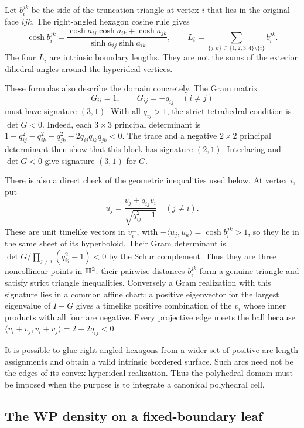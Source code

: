 Let $b_i^{jk}$ be the side of the truncation triangle at vertex $i$ that lies
in the original face $ijk$. The right-angled hexagon cosine rule gives
\begin{equation}
 \cosh b_i^{jk}=
 \frac{\cosh a_{ij}\cosh a_{ik}+\cosh a_{jk}}
      {\sinh a_{ij}\sinh a_{ik}},
 \qquad
 L_i=\sum_{\{j,k\}\subset\{1,2,3,4\}\setminus\{i\}}b_i^{jk}.
 \label{eq:truncationlengths}
\end{equation}
The four $L_i$ are intrinsic boundary lengths. They are not the sums of the
exterior dihedral angles around the hyperideal vertices.

These formulas also describe the domain concretely. The Gram matrix
\begin{equation}
 G_{ii}=1,\qquad G_{ij}=-q_{ij}\quad(i\ne j)
 \label{eq:gram}
\end{equation}
must have signature $(3,1)$. With all $q_{ij}>1$, the strict tetrahedral
condition is $\det G<0$. Indeed, each $3\times3$ principal determinant is
$1-q_{ij}^2-q_{ik}^2-q_{jk}^2-2q_{ij}q_{ik}q_{jk}<0$.
The trace and a negative $2\times2$ principal determinant then show that
this block has signature $(2,1)$. Interlacing and $\det G<0$ give
signature $(3,1)$ for $G$.

There is also a direct check of the geometric inequalities used below.
At vertex $i$, put
\[
 u_j=\frac{v_j+q_{ij}v_i}{\sqrt{q_{ij}^2-1}}\quad(j\ne i).
\]
These are unit timelike vectors in $v_i^\perp$, with
$-\langle u_j,u_k\rangle=\cosh b_i^{jk}>1$, so they lie in the same
sheet of its hyperboloid. Their Gram determinant is
$\det G/\prod_{j\ne i}(q_{ij}^2-1)<0$ by the Schur complement.
Thus they are three noncollinear points in $\mathbb H^2$: their pairwise
distances $b_i^{jk}$ form a genuine triangle and satisfy strict triangle
inequalities. Conversely a Gram realization with this signature lies in
a common affine chart: a positive eigenvector for the largest eigenvalue
of $I-G$ gives a timelike positive combination of the $v_i$ whose inner
products with all four are negative. Every projective edge meets the ball
because $\langle v_i+v_j,v_i+v_j\rangle=2-2q_{ij}<0$.

It is possible to glue right-angled hexagons from a wider set of positive
arc-length assignments and obtain a valid intrinsic bordered surface. Such
arcs need not be the edges of its convex hyperideal realization. Thus the
polyhedral domain must be imposed when the purpose is to integrate a
canonical polyhedral cell.

\subsection{The WP density on a fixed-boundary leaf}

